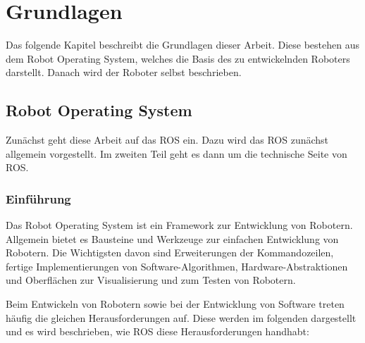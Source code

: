 \chapter{Grundlagen} \label{Kap2}

Das folgende Kapitel beschreibt die Grundlagen dieser Arbeit. Diese bestehen aus dem Robot Operating System, welches die Basis des zu entwickelnden Roboters darstellt. Danach wird der Roboter selbst beschrieben.

\section{Robot Operating System}

Zunächst geht diese Arbeit auf das \ac{ROS} ein. Dazu wird das \ac{ROS} zunächst allgemein vorgestellt. Im zweiten Teil geht es dann um die technische Seite von \ac{ROS}.

\subsection{Einführung}

Das Robot Operating System ist ein Framework zur Entwicklung von Robotern. Allgemein bietet es Bausteine und Werkzeuge zur einfachen Entwicklung von Robotern. Die Wichtigsten davon sind Erweiterungen der Kommandozeilen, fertige Implementierungen von Software-Algorithmen, Hardware-Abstraktionen und Oberflächen zur Visualisierung und zum Testen von Robotern.

Beim Entwickeln von Robotern sowie bei der Entwicklung von Software treten häufig die gleichen Herausforderungen auf. Diese werden im folgenden dargestellt und es wird beschrieben, wie \ac{ROS} diese Herausforderungen handhabt:

